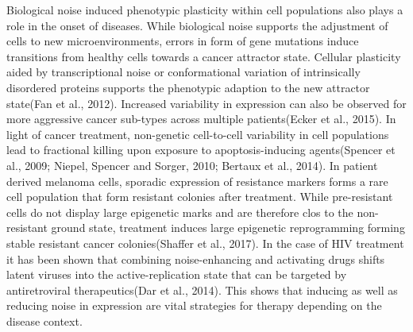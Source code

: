 Biological noise induced phenotypic plasticity within cell populations also plays a role in the onset of diseases. While biological noise supports the adjustment of cells to new microenvironments, errors in form of gene mutations induce transitions from healthy cells towards a cancer attractor state. Cellular plasticity aided by transcriptional noise or conformational variation of intrinsically disordered proteins supports the phenotypic adaption to the new attractor state(Fan et al., 2012). Increased variability in expression can also be observed for more aggressive cancer sub-types across multiple patients(Ecker et al., 2015). In light of cancer treatment, non-genetic cell-to-cell variability in cell populations lead to fractional killing upon exposure to apoptosis-inducing agents(Spencer et al., 2009; Niepel, Spencer and Sorger, 2010; Bertaux et al., 2014). In patient derived melanoma cells, sporadic expression of resistance markers forms a rare cell population that form resistant colonies after treatment. While pre-resistant cells do not display large epigenetic marks and are therefore clos to the non-resistant ground state, treatment induces large epigenetic reprogramming forming stable resistant cancer colonies(Shaffer et al., 2017). 
In the case of HIV treatment it has been shown that combining noise-enhancing and activating drugs shifts latent viruses into the active-replication state that can be targeted by antiretroviral therapeutics(Dar et al., 2014).  This shows that inducing as well as reducing noise in expression are vital strategies for therapy depending on the disease context.
